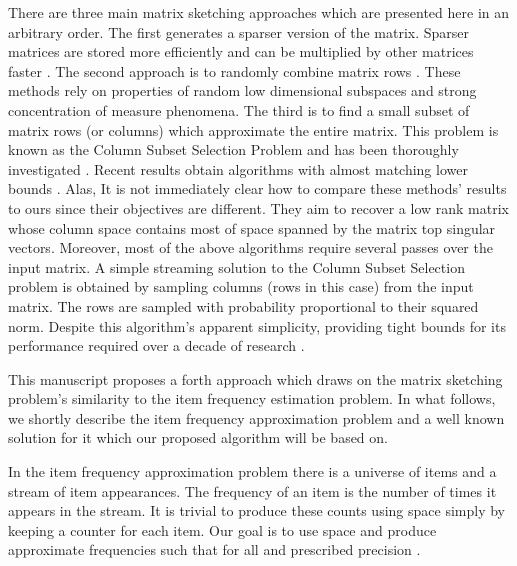 \documentclass[]{article}
\begin{document}
There are three main matrix sketching approaches which are presented here in an arbitrary order.
The first generates a sparser version of the matrix. 
Sparser matrices are stored more efficiently and can be multiplied by other matrices 
faster \cite{AroraHazanKale2006}\cite{AchlioptasMcsherry2007}.
The second approach is to randomly combine matrix rows  \cite{PapadimitriouTRV1998}\cite{Vempala2004}\cite{Sarlos06}\cite{tygert07PNAS}.
These methods rely on properties of random low dimensional subspaces and strong concentration of measure phenomena.
The third is to find a small subset of matrix rows (or columns) which approximate the entire matrix. 
This problem is known as the Column Subset Selection Problem and has been thoroughly investigated 
\cite{FriezeKannanVempala1998}\cite{Drineas03passefficient}\cite{BoutsidisMahoneyDrineas2009}\cite{DeshpandeV06}\cite{DrineasMohoneyMuthukrishnan2011}\cite{BoutsidisDrineasMagdon2011}. Recent results obtain algorithms with almost matching lower bounds \cite{DeshpandeV06}\cite{BoutsidisDrineasMagdon2011}\cite{ClarksonWoodruff2009}.
Alas, It is not immediately clear how to compare these methods' results to ours since their objectives are different.
They aim to recover a low rank matrix whose column space contains most of space spanned by the matrix top  singular vectors.
Moreover, most of the above algorithms require several passes over the input matrix.
A simple streaming solution to the Column Subset Selection problem is obtained by sampling columns (rows in this case) from the input matrix.
The rows are sampled with probability proportional to their squared norm.
Despite this algorithm's apparent simplicity, providing tight bounds for its performance required over a decade of research \cite{FriezeKannanVempala1998}\cite{AhlswedeW02}\cite{DrineasKannan2003}\cite{RudelsonVershyninMatrixSampling2007}\cite{VershyninMatrixChernoffBounds}\cite{Oliviera2010}\cite{DrineasMohoneyMuthukrishnan2011}. 

This manuscript proposes a forth approach which draws on the matrix sketching problem's similarity to the item frequency estimation problem.
In what follows, we shortly describe the item frequency approximation problem and a well known solution for it
which our proposed algorithm will be based on. 


In the item frequency approximation problem there is a universe 
of  items  and a stream  of item appearances.
The frequency of an item is the number of times it appears in the stream.
It is trivial to produce these counts using  space simply by keeping a counter for each item.
Our goal is to use  space and produce approximate 
frequencies  such that  for all  and prescribed precision .
\end{document}
